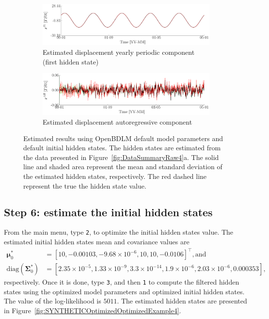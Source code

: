 \begin{figure}[h!]
\ContinuedFloat
\begin{subfigure}{\linewidth}
\includegraphics[width=0.9\linewidth]{./docfigs/Example_SYNTHETIC/default/TS01_S1_4.pdf}
\caption{Estimated displacement yearly periodic component (first hidden state)}
\end{subfigure}
\begin{subfigure}{\linewidth}
\includegraphics[width=0.9\linewidth]{./docfigs/Example_SYNTHETIC/default/TS01_AR_6.pdf} 
\caption{Estimated displacement autoregressive component}
\end{subfigure}
\caption{Estimated results using OpenBDLM default model parameters and default initial hidden states. The hidden states are estimated from the data presented in Figure~\ref{fig:DataSummaryRaw4}a. The solid line and shaded area represent the mean and standard deviation of the estimated hidden states, respectively. The red dashed line represent the true the hidden state value.}
\label{fig:SYNTHETICDefaultDefaultExample4}
\end{figure}

\subsection{Step 6: estimate the initial hidden states}

From the main menu, type  \colorbox{light-gray}{\lstinline[basicstyle = \mlttfamily \small, backgroundcolor = \color{light-gray}]!2!}, to optimize the initial hidden states value.
The estimated initial hidden states mean and covariance values are 
\begin{align*}
\bm \mu^{*}_{0} & = [	10 ,   	-0.00103,	-9.68\times10^{-6},	10   , 	10    ,	-0.0106  ]^{\intercal}, \text{and} \\
 \text{diag}(\bm\Sigma^{*}_{0}) & = [	2.35\times10^{-5}	, 1.33\times10^{-9},	3.3\times10^{-14}	, 1.9\times10^{-6}	, 2.03\times10^{-6}	,0.000353    ], 
 \end{align*}
 respectively.
Once it is done, type  \colorbox{light-gray}{\lstinline[basicstyle = \mlttfamily \small, backgroundcolor = \color{light-gray}]!3!}, and then  \colorbox{light-gray}{\lstinline[basicstyle = \mlttfamily \small, backgroundcolor = \color{light-gray}]!1!} to compute the filtered hidden states using the optimized model parameters and optimized initial hidden states.
The value of the log-likelihood is $5011$.
The estimated hidden states are presented in Figure~\ref{fig:SYNTHETICOptimizedOptimizedExample4}.


